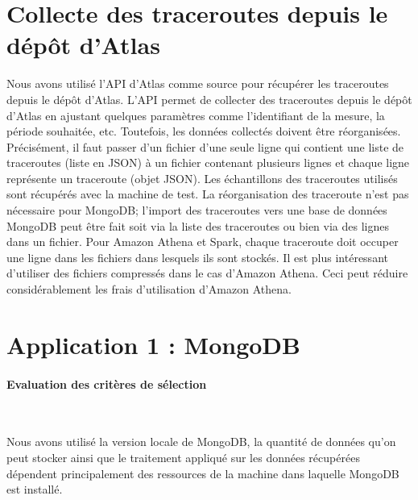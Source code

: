 \section{Collecte des traceroutes depuis le dépôt d'Atlas }
Nous avons utilisé l'API d'Atlas  comme source pour récupérer les traceroutes depuis le dépôt d'Atlas. L'API permet de collecter des traceroutes depuis le dépôt d'Atlas en ajustant quelques paramètres comme  l'identifiant de la mesure, la période souhaitée, etc. Toutefois, les données collectés doivent être réorganisées. Précisément, il faut passer d'un fichier d'une seule ligne qui contient une liste de traceroutes (liste en JSON) à un fichier contenant plusieurs lignes et chaque ligne représente un traceroute (objet JSON). Les échantillons des traceroutes utilisés sont récupérés  avec la machine de test. 
La réorganisation des traceroute n'est pas nécessaire  pour MongoDB; l'import des traceroutes vers une base de données MongoDB peut être fait soit  via la liste des traceroutes ou bien via des lignes dans un fichier. Pour Amazon Athena et Spark, chaque traceroute doit occuper une  ligne dans les fichiers dans lesquels ils sont stockés. Il est plus  intéressant d'utiliser des fichiers compressés dans le cas d'Amazon Athena. Ceci peut réduire considérablement les frais d'utilisation d'Amazon Athena.


\section{Application 1 : MongoDB} \label{mongodb-impleme}


\paragraph{Evaluation des critères de sélection}~

Nous avons utilisé la version locale de MongoDB, la quantité de données qu'on peut stocker ainsi que le traitement appliqué sur les données récupérées dépendent principalement des ressources de la machine dans laquelle MongoDB est installé.
 
